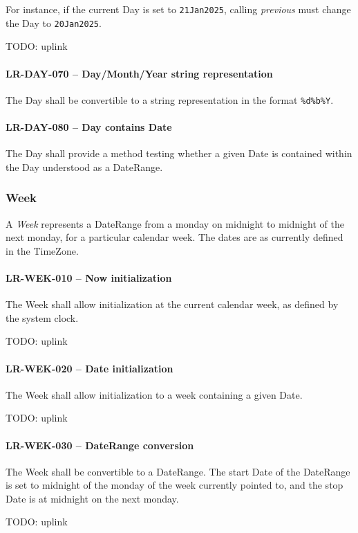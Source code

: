 For instance, if the current Day is set to \lstinline{21Jan2025}, calling
\emph{previous} must change the Day to \lstinline{20Jan2025}.

TODO: uplink

\paragraph{LR-DAY-070 -- Day/Month/Year string representation}
The Day shall be convertible to a string representation in the format
\lstinline{%d%b%Y}.

\paragraph{LR-DAY-080 -- Day contains Date}
The Day shall provide a method testing whether a given Date is contained
within the Day understood as a DateRange.

\subsubsection{Week}
A \emph{Week} represents a DateRange from a monday on midnight to midnight of
the next monday, for a particular calendar week.
The dates are as currently defined in the TimeZone.

\paragraph{LR-WEK-010 -- Now initialization}
The Week shall allow initialization at the current calendar week, as defined by
the system clock.

TODO: uplink

\paragraph{LR-WEK-020 -- Date initialization}
The Week shall allow initialization to a week containing a given Date.

TODO: uplink

\paragraph{LR-WEK-030 -- DateRange conversion}
The Week shall be convertible to a DateRange. The start Date of the DateRange
is set to midnight of the monday of the week currently pointed to, and the
stop Date is at midnight on the next monday.

TODO: uplink

